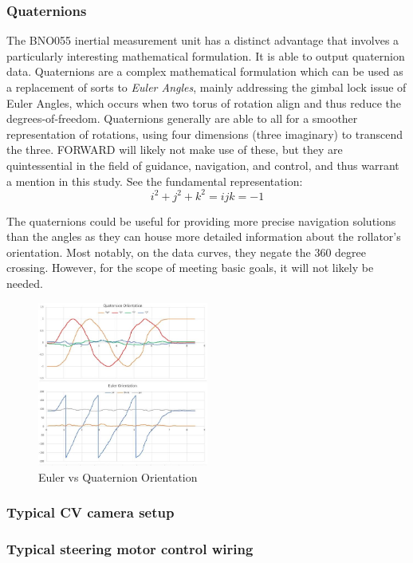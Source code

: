 \subsubsection{Quaternions}
\noindent The BNO055 inertial measurement unit has a distinct advantage that involves a particularly interesting mathematical formulation. It is able to output quaternion data. Quaternions are a complex mathematical formulation which can be used as a replacement of sorts to \textit{Euler Angles}, mainly addressing the gimbal lock issue of Euler Angles, which occurs when two torus of rotation align and thus reduce the degrees-of-freedom. Quaternions generally are able to all for a smoother representation of rotations, using four dimensions (three imaginary) to transcend the three. \cite{quat} FORWARD will likely not make use of these, but they are quintessential in the field of guidance, navigation, and control, and thus warrant a mention in this study. See the fundamental representation:\\
$$i^2+j^2+k^2=ijk=-1$$

\noindent The quaternions could be useful for providing more precise navigation solutions than the angles as they can house more detailed information about the rollator's orientation. Most notably, on the data curves, they negate the 360 degree crossing. However, for the scope of meeting basic goals, it will not likely be needed.

\begin{figure}[H]
	\centering
	\includegraphics[width=0.5\textwidth]{./Images/euler-quat.JPG}
	\caption{\label{fig:euler-quat}Euler vs Quaternion Orientation \cite{euler-quat}}
\end{figure}

\subsubsection{Typical CV camera setup}

\subsubsection{Typical steering motor control wiring}